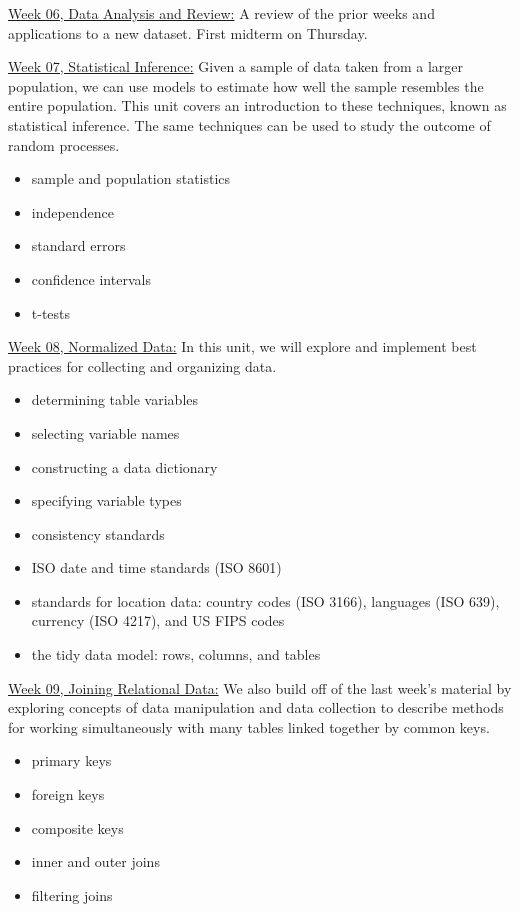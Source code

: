 \documentclass[12pt]{article}
\begin{document}
\bigskip

\underline{Week 06, Data Analysis and Review:}
A review of the prior weeks and applications to a
new dataset. First midterm on Thursday.

\bigskip

\underline{Week 07, Statistical Inference:}
Given a sample of data taken from a larger population, we can use
models to estimate how well the sample resembles the entire population.
This unit covers an introduction to these techniques, known as statistical
inference. The same techniques can be used to study the outcome of random
processes.
\begin{itemize}\setlength\itemsep{0em}
\item
  sample and population statistics
\item
  independence
\item
  standard errors
\item
  confidence intervals
\item
  t-tests
\end{itemize}

\bigskip

\underline{Week 08, Normalized Data:}
In this unit, we will explore and implement best practices for collecting and
organizing data.
\begin{itemize}\setlength\itemsep{0em}
\item
  determining table variables
\item
  selecting variable names
\item
  constructing a data dictionary
\item
  specifying variable types
\item
  consistency standards
\item
  ISO date and time standards (ISO 8601)
\item
  standards for location data: country codes (ISO 3166), languages (ISO
  639), currency (ISO 4217), and US FIPS codes
\item
  the tidy data model: rows, columns, and tables
\end{itemize}

\bigskip

\underline{Week 09, Joining Relational Data:}
We also build off of the last week's material by exploring
concepts of data manipulation and data
collection to describe methods for working simultaneously with many
tables linked together by common keys.
\begin{itemize}\setlength\itemsep{0em}
\item
  primary keys
\item
  foreign keys
\item
  composite keys
\item
  inner and outer joins
\item
  filtering joins
\end{itemize}
\end{document}
